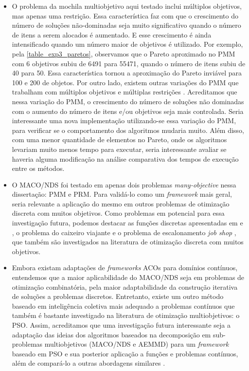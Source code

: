 \begin{itemize}
	\item O problema da mochila multiobjetivo aqui testado inclui múltiplos objetivos, mas apenas uma restrição. Essa característica faz com que o crescimento do número de soluções não-dominadas seja muito significativo quando o número de itens a serem alocados é aumentado. E esse crescimento é ainda intensificado quando um número maior de objetivos é utilizado. Por exemplo, pela \ref{table_exp3_paretos}, observamos  que o Pareto aproximado no PMM com 6 objetivos subiu de 6491 para 55471, quando o número de itens subiu de 40 para 50. Essa característica tornou a aproximação do Pareto inviável para 100 e 200 de objetos. Por outro lado, existem outras variações do PMM que trabalham com múltiplos objetivos e múltiplas restrições \cite{Ishibuchi2015,Alaya2007}. Acreditamos que nessa variação do PMM, o crescimento do número de soluções não dominadas com o aumento do número de itens e/ou objetivos seja mais controlada. Seria interessante uma nova implementação utilizando-se essa variação do PMM, para verificar se o comportamento dos algoritmos mudaria muito. Além disso, com uma menor quantidade de elementos no Pareto, onde os algoritmos levariam muito menos tempo para executar, seria interessante avaliar se haveria alguma modificação na análise comparativa dos tempos de execução entre os métodos.
	
	\item O MACO/NDS foi testado em apenas dois problemas \textit{many-objective} nessa dissertação: PMM e PRM. Para validá-lo como um \textit{framework} mais geral, seria relevante a aplicação do mesmo em outros problemas de otimização discreta com muitos objetivos. Como problemas em potencial para essa investigação futura, podemos destacar as funções discretas apresentadas em \cite{DiscreteFunctions1} e  \cite{DiscreteFunctions2}, o problema do caixeiro viajante \cite{Riveros2016} e o problema de escalonamento \textit{job shop} \cite{JobShop}, que também são investigados na literatura de otimização discreta com muitos objetivos.
	
	\item Embora existam adaptações de \textit{frameworks} ACOs para domínios contínuos, entendemos que a maior aplicabilidade do MACO/NDS seja em problemas de otimização combinatória, pela maior adaptabilidade da construção iterativa de soluções a problemas discretos. Entretanto, existe um outro método baseado em inteligência coletiva mais adequado a problemas contínuos que também é bastante investigado na literatura de otimização multiobjetivos: o PSO. Assim, acreditamos que uma investigação futura interessante seja a adaptação das ideias dos algoritmos baseados na decomposição em sub-problemas multiobjetivos (MACO/NDS e AEMMD) para um \textit{framework} baseado em PSO e sua posterior aplicação a funções e problemas contínuos, além de compará-lo a outras abordagens similares \cite{Freire2017}.
\end{itemize}

